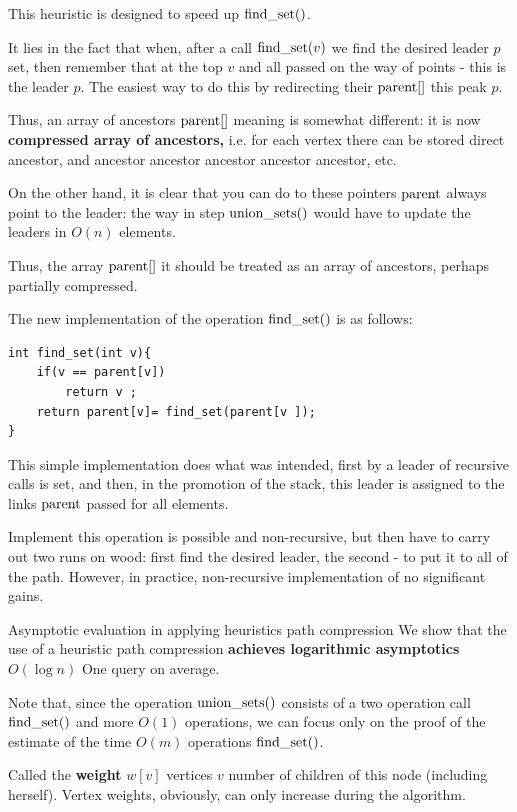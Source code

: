 This heuristic is designed to speed up ${\rm find \_set}()$.

It lies in the fact that when, after a call ${\rm find \_set} (v)$ we find the desired leader $p$ set, then remember that at the top $v$ and all passed on the way of points - this is the leader $p$. The easiest way to do this by redirecting their ${\rm parent} []$ this peak $p$.

Thus, an array of ancestors ${\rm parent} []$ meaning is somewhat different: it is now \textbf{compressed array of ancestors,} i.e. for each vertex there can be stored direct ancestor, and ancestor ancestor ancestor ancestor ancestor, etc.

On the other hand, it is clear that you can do to these pointers ${\rm parent}$ always point to the leader: the way in step ${\rm union \_sets}()$ would have to update the leaders in $O (n)$ elements.

Thus, the array ${\rm parent} []$ it should be treated as an array of ancestors, perhaps partially compressed.

The new implementation of the operation ${\rm find \_set}()$ is as follows:

\begin{verbatim}
int find_set(int v){
    if(v == parent[v])
        return v ;
    return parent[v]= find_set(parent[v ]);
} 
\end{verbatim}
This simple implementation does what was intended, first by a leader of recursive calls is set, and then, in the promotion of the stack, this leader is assigned to the links ${\rm parent}$ passed for all elements.

Implement this operation is possible and non-recursive, but then have to carry out two runs on wood: first find the desired leader, the second - to put it to all of the path. However, in practice, non-recursive implementation of no significant gains.

Asymptotic evaluation in applying heuristics path compression
We show that the use of a heuristic path compression \textbf{achieves logarithmic asymptotics} $O (\log n)$ One query on average.

Note that, since the operation ${\rm union \_sets}()$ consists of a two operation call ${\rm find \_set}()$ and more $O (1)$ operations, we can focus only on the proof of the estimate of the time $O (m)$ operations ${\rm find \_set}()$.

Called the \textbf{weight} $w [v]$ vertices $v$ number of children of this node (including herself). Vertex weights, obviously, can only increase during the algorithm.


